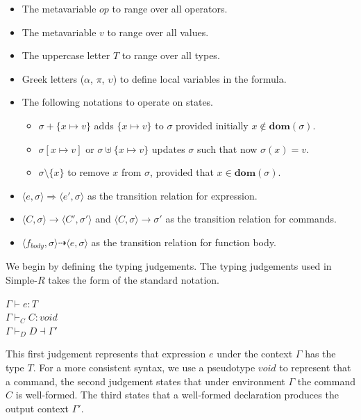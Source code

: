 \documentclass[a4paper,12pt]{report}
\begin{document}
\renewcommand\labelitemii{$\blacksquare$}
\begin{itemize}
  \item The metavariable $op$ to range over all operators. 
  \item The metavariable $v$ to range over all values.
  \item The uppercase letter $T$ to range over all types.
  \item Greek letters ($\alpha$, $\pi$, $\upsilon$) to define local variables in 
  the formula. 
  \item The following notations to operate on states. 
    \begin{itemize}
      \item $\sigma + \{x \mapsto v\}$ adds $\{x \mapsto v\}$ to $\sigma$ provided initially $x \notin\textbf{dom}(\sigma)$. 
      \item $\sigma[x \mapsto v]$ or $\sigma \uplus \{x \mapsto v\}$ updates $\sigma$ such that now $\sigma(x) = v$.
      \item $\sigma \setminus \{x\}$ to remove $x$ from $\sigma$, provided that $x \in \textbf{dom}(\sigma)$.
    \end{itemize}
  \item $\langle e, \sigma \rangle \Longrightarrow \langle e', \sigma \rangle$ as the transition relation for expression.
  \item $\langle C, \sigma \rangle \longrightarrow \langle C', \sigma' \rangle$ and $\langle C, \sigma \rangle \longrightarrow \sigma'$ as the transition relation for commands.
  \item $\langle f_{body}, \sigma \rangle \dashrightarrow \langle e, \sigma \rangle$ as the transition relation for function body.
\end{itemize}

\par
We begin by defining the typing judgements. The typing judgements used in 
Simple-$R$ takes the form of the standard notation. 
\begin{center}
  $\Gamma \vdash e : T$\\
  $\Gamma \vdash_{C} C : void$\\
  $\Gamma \vdash_{D} D \dashv \Gamma'$\\
\end{center}
This first judgement represents that expression $e$ 
under the context $\Gamma$ has the type $T$. For a more consistent syntax, 
we use a pseudotype $void$ to represent that a command, the second judgement 
states that under environment $\Gamma$ the command $C$ is well-formed. 
The third states that a well-formed declaration produces the output context $\Gamma'$. 
\end{document}
